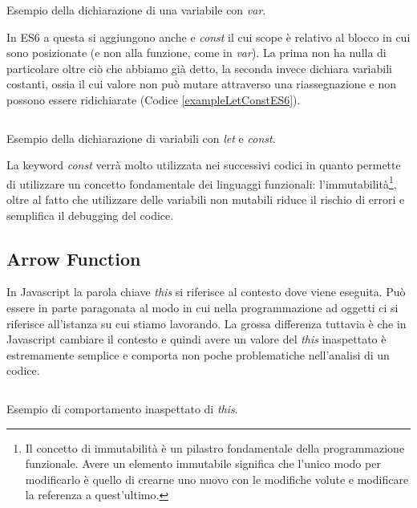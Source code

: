 \begin{listing}[ht]
\inputminted{Javascript}{sources/exampleVarES5.js}
\caption{Esempio della dichiarazione di una variabile con \textit{var}.}
\label{exampleVarES5}
\end{listing}

In ES6 a questa si aggiungono anche  e \textit{const} il cui scope è relativo al blocco in cui sono posizionate (e non alla funzione, come in \textit{var}). La prima non ha nulla di particolare oltre ciò che abbiamo già detto, la seconda invece dichiara variabili costanti, ossia il cui valore non può mutare attraverso una riassegnazione e non possono essere ridichiarate (Codice \ref{exampleLetConstES6}).

\begin{listing}[ht]
\inputminted{Javascript}{sources/exampleLetConstES6.js}
\caption{Esempio della dichiarazione di variabili con \textit{let} e \textit{const}.}
\label{exampleLetConstES6}
\end{listing}

La keyword \textit{const} verrà molto utilizzata nei successivi codici in quanto permette di utilizzare un concetto fondamentale dei linguaggi funzionali: l'immutabilità\footnote{Il concetto di immutabilità è un pilastro fondamentale della programmazione funzionale. Avere un elemento immutabile significa che l'unico modo per modificarlo è quello di crearne uno nuovo con le modifiche volute e modificare la referenza a quest'ultimo.}, oltre al fatto che utilizzare delle variabili non mutabili riduce il rischio di errori e semplifica il debugging del codice.

\subsection{Arrow Function}
In Javascript la parola chiave \textit{this} si riferisce al contesto dove viene eseguita. Può essere in parte paragonata al modo in cui nella programmazione ad oggetti ci si riferisce all'istanza su cui stiamo lavorando. La grossa differenza tuttavia è che in Javascript cambiare il contesto e quindi avere un valore del \textit{this} inaspettato è estremamente semplice e comporta non poche problematiche nell'analisi di un codice.

\begin{listing}[ht]
\inputminted{Javascript}{sources/exampleShadowThisES5.js}
\caption{Esempio di comportamento inaspettato di \textit{this}.}
\label{exampleShadowThisES5}
\end{listing}

